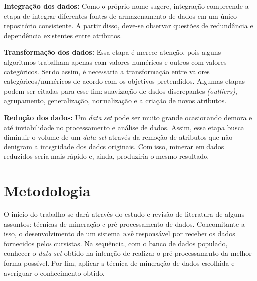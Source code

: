 \documentclass[projtg]{mdtufsm}
\begin{document}
\textbf{Integração dos dados:} Como o próprio nome sugere, integração compreende a etapa de integrar diferentes fontes de armazenamento de dados em um único repositório consistente. A partir disso, deve-se observar questões de redundância e dependência existentes entre atributos.

\textbf{Transformação dos dados:} Essa etapa é merece atenção, pois alguns algoritmos trabalham apenas com valores numéricos e outros com valores categóricos. Sendo assim, é necessária a transformação entre valores categóricos/numéricos de acordo com os objetivos pretendidos. Algumas etapas podem ser citadas para esse fim: suavização de dados discrepantes \textit{(outliers)}, agrupamento, generalização, normalização e a criação de novos atributos.

\textbf{Redução dos dados:} Um \textit{data set} pode ser muito grande ocasionando demora e até inviabilidade no processamento e análise de dados. Assim, essa etapa busca diminuir o volume de um \textit{data set} através da remoção de atributos que não denigram a integridade dos dados originais. Com isso, minerar em dados reduzidos seria mais rápido e, ainda, produziria o mesmo resultado. 




\chapter{Metodologia}
O início do trabalho se dará através do estudo e revisão de literatura de alguns assuntos: técnicas de mineração e pré-processamento de dados. Concomitante a isso, o desenvolvimento de um sistema {\it web} responsável por receber os dados fornecidos pelos cursistas. Na sequência, com o banco de dados populado, conhecer o \textit{data set} obtido na intenção de realizar o pré-processamento da melhor forma possível. Por fim, aplicar a técnica de mineração de dados escolhida e averiguar o conhecimento obtido. 
    
\end{document}
